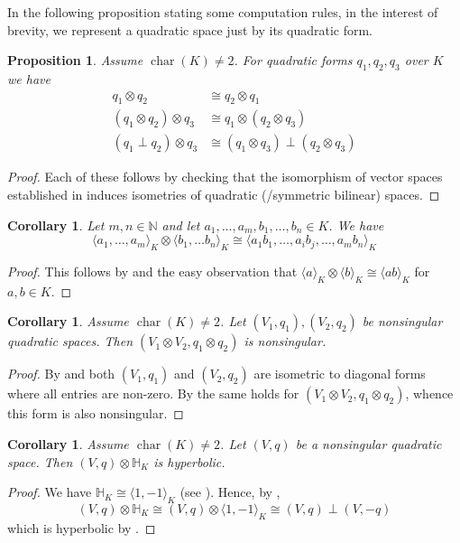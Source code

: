 \documentclass[12pt, leqno, british]{amsart}
\theoremstyle{definition}
\theoremstyle{plain}
\newtheorem{prop}[defi]{Proposition}
\newtheorem{cor}[defi]{Corollary}
\theoremstyle{remark}
\newcommand{\mbb}{\mathbb}
\newcommand{\nat}{\mbb N}
\DeclareMathOperator{\charac}{char}
\begin{document}
In the following proposition stating some computation rules, in the interest of brevity, we represent a quadratic space just by its quadratic form.
\begin{prop}\label{P:tensor-product-properties-QF}
Assume $\charac(K) \neq 2$.
For quadratic forms $q_1, q_2, q_3$ over $K$ we have
\begin{align*}
q_1 \otimes q_2 &\cong q_2 \otimes q_1 \\
(q_1 \otimes q_2) \otimes q_3 &\cong q_1 \otimes (q_2 \otimes q_3) \\
(q_1 \perp q_2) \otimes q_3 &\cong (q_1 \otimes q_3) \perp (q_2 \otimes q_3)
\end{align*}
\end{prop}
\begin{proof}
Each of these follows by checking that the isomorphism of vector spaces established in  induces isometries of quadratic (/symmetric bilinear) spaces.
\end{proof}
\begin{cor}\label{C:tensor-product-diagonal}
Let $m, n \in \nat$ and let $a_1, \ldots, a_m, b_1, \ldots, b_n \in K$.
We have
$$ \langle a_1, \ldots, a_m \rangle_K \otimes \langle b_1, \ldots b_n \rangle_K \cong \langle a_1b_1, \ldots, a_ib_j, \ldots, a_mb_n \rangle_K $$
\end{cor}
\begin{proof}
This follows by  and the easy observation that $\langle a \rangle_K \otimes \langle b \rangle_K \cong \langle ab \rangle_K$ for $a, b \in K$.
\end{proof}
\begin{cor}\label{C:tensor-product-nonsingular}
Assume $\charac(K) \neq 2$.
Let $(V_1, q_1), (V_2, q_2)$ be nonsingular quadratic spaces.
Then $(V_1 \otimes V_2, q_1 \otimes q_2)$ is nonsingular.
\end{cor}
\begin{proof}
By  and  both $(V_1, q_1)$ and $(V_2, q_2)$ are isometric to diagonal forms where all entries are non-zero.
By  the same holds for $(V_1 \otimes V_2, q_1 \otimes q_2)$, whence this form is also nonsingular.
\end{proof}
\begin{cor}\label{C:tensor-product-hyperbolic}
Assume $\charac(K) \neq 2$.
Let $(V, q)$ be a nonsingular quadratic space.
Then $(V, q) \otimes \mbb{H}_K$ is hyperbolic.
\end{cor}
\begin{proof}
We have $\mbb{H}_K \cong \langle 1, -1 \rangle_K$ (see ).
Hence, by ,
$$ (V, q) \otimes \mbb{H}_K \cong (V, q) \otimes \langle 1, -1 \rangle_K \cong (V, q) \perp (V, -q) $$
which is hyperbolic by .
\end{proof}
\end{document}
